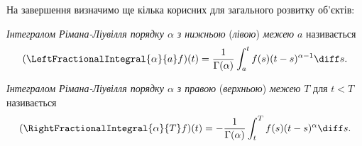 На завершення визначимо ще кілька корисних для загального розвитку об'єктів:
\begin{definition}
    \textit{Інтегралом Рімана-Ліувілля порядку $\alpha$ з нижньою }(\textit{лівою})\textit{ межею} $a$ називається
    \begin{equation}
        (\LeftFractionalIntegral{\alpha}{a} f)(t) = \frac{1}{\Gamma(\alpha)} \int_a^t f(s) (t - s)^{\alpha - 1} \diff s.
    \end{equation}
\end{definition}
\begin{definition}
    \textit{Інтегралом Рімана-Ліувілля порядку $\alpha$ з правою }(\textit{верхньою})\textit{ межею} $T$ для $t < T$ називається
    \begin{equation}
        (\RightFractionalIntegral{\alpha}{T} f)(t) = -\frac{1}{\Gamma(\alpha)} \int_t^T f(s) (t - s)^\alpha \diff s.
    \end{equation}
\end{definition}
